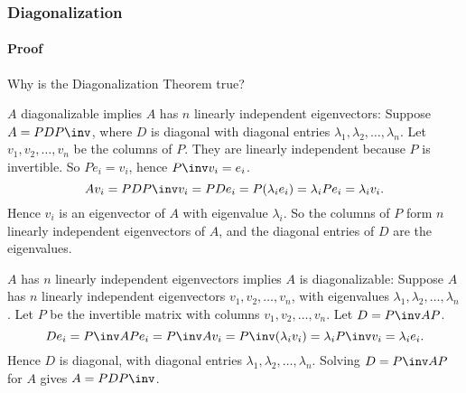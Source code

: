 
\begin{frame}
\frametitle{Diagonalization}
\framesubtitle{Proof}

Why is the Diagonalization Theorem true?

\medskip
\begin{webonly}
\alert{$A$ diagonalizable implies $A$ has $n$ linearly independent eigenvectors:}
Suppose $A = PDP\inv$, where $D$ is diagonal with diagonal entries $\lambda_1,\lambda_2,\ldots,\lambda_n$.
Let $v_1,v_2,\ldots,v_n$ be the columns of $P$.
They are linearly independent because
$P$ is invertible.
So $Pe_i = v_i$, hence $P\inv v_i = e_i$.
\[ Av_i = PDP\inv v_i = PDe_i = P(\lambda_i e_i) = \lambda_i Pe_i =
\lambda_i v_i. \]
Hence $v_i$ is an eigenvector of $A$ with eigenvalue $\lambda_i$.
So the columns of $P$ form $n$ linearly independent eigenvectors of $A$, and the
diagonal entries of $D$ are the eigenvalues.

\medskip
\alert{$A$ has $n$ linearly independent eigenvectors implies $A$ is diagonalizable:}
Suppose $A$ has $n$ linearly independent eigenvectors $v_1,v_2,\ldots,v_n$, with
eigenvalues $\lambda_1,\lambda_2,\ldots,\lambda_n$.
Let $P$ be the invertible matrix with columns $v_1,v_2,\ldots,v_n$.
Let $D = P\inv A P$.
\[ De_i = P\inv A Pe_i = P\inv A v_i = P\inv(\lambda_i v_i)
= \lambda_i P\inv v_i = \lambda_i e_i. \]
Hence $D$ is diagonal, with diagonal entries
$\lambda_1,\lambda_2,\ldots,\lambda_n$.
Solving $D = P\inv A P$ for $A$ gives $A = PDP\inv$.
\end{webonly}

\end{frame}



